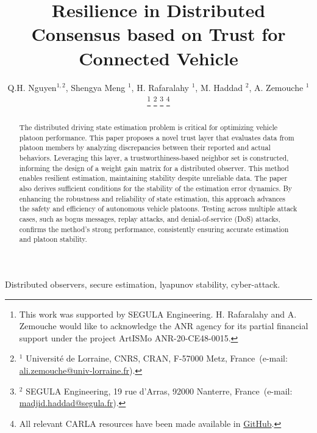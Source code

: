 \documentclass[letterpaper, 10pt, conference]{ieeeconf}  %
\begin{document}
\title{\bf Resilience in Distributed
 Consensus based on Trust for Connected Vehicle }
\author{Q.H. Nguyen$^{1,2}$, Shengya Meng $^{1}$, H. Rafaralahy $^{1}$, M. Haddad $^{2}$, A. Zemouche $^{1}$
%
\thanks{This work was supported by SEGULA Engineering. H. Rafaralahy and A. Zemouche would like to acknowledge the ANR agency for its partial financial support under the project ArtISMo ANR-20-CE48-0015.
}
%
\thanks{$^{1}$ Universit\'e de Lorraine, CNRS, CRAN, F-57000 Metz, France~(e-mail: \protect\url{ali.zemouche@univ-lorraine.fr}).}
%
\thanks{$^{2}$ SEGULA Engineering, 19 rue d'Arras, 92000 Nanterre, France~(e-mail: \protect\url{madjid.haddad@segula.fr}).}
%
\thanks{All relevant CARLA resources have been made available in \protect\href{https://github.com/kslhuy/CACC_UIO_simulink}{GitHub}.}
}
\maketitle

\begin{abstract}
The distributed driving state estimation problem is critical for optimizing vehicle platoon performance. This paper proposes a novel trust layer that evaluates data from platoon members by analyzing discrepancies between their reported and actual behaviors. Leveraging this layer, a trustworthiness-based neighbor set is constructed, informing the design of a weight gain matrix for a distributed observer. This method enables resilient estimation, maintaining stability despite unreliable data. The paper also derives sufficient conditions for the stability of the estimation error dynamics. By enhancing the robustness and reliability of state estimation, this approach advances the safety and efficiency of autonomous vehicle platoons. Testing across multiple attack cases, such as bogus messages, replay attacks, and denial-of-service (DoS) attacks, confirms the method's strong performance, consistently ensuring accurate estimation and platoon stability.
\end{abstract}

\begin{keywords}
Distributed observers, secure estimation, lyapunov stability, cyber-attack.
\end{keywords}
\end{document}
